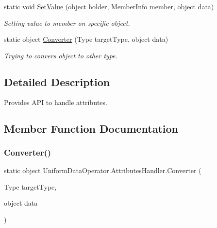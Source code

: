 \begin{DoxyCompactItemize}
static void \mbox{\hyperlink{class_uniform_data_operator_1_1_attributes_handler_a2619c62d9978b033619e4bfd248f5290}{Set\+Value}} (object holder, Member\+Info member, object data)
\begin{DoxyCompactList}\small\item\em Setting value to member on specific object. \end{DoxyCompactList}\item 
static object \mbox{\hyperlink{class_uniform_data_operator_1_1_attributes_handler_a3c0dc5fda5e0397bf6b284392236c46e}{Converter}} (Type target\+Type, object data)
\begin{DoxyCompactList}\small\item\em Trying to convers object to other type. \end{DoxyCompactList}\end{DoxyCompactItemize}


\subsection{Detailed Description}
Provides A\+PI to handle attributes. 



\subsection{Member Function Documentation}
\mbox{\label{class_uniform_data_operator_1_1_attributes_handler_a3c0dc5fda5e0397bf6b284392236c46e}} 
\subsubsection{\texorpdfstring{Converter()}{Converter()}}
{\footnotesize\ttfamily static object Uniform\+Data\+Operator.\+Attributes\+Handler.\+Converter (\begin{DoxyParamCaption}\item[{Type}]{target\+Type,  }\item[{object}]{data }\end{DoxyParamCaption})\hspace{0.3cm}{\ttfamily [static]}}




